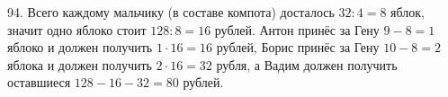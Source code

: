 94. Всего каждому мальчику (в составе компота) досталось $32:4=8$ яблок, значит одно яблоко стоит $128:8=16$ рублей. Антон принёс за Гену $9-8=1$ яблоко и должен получить $1\cdot16=16$ рублей, Борис принёс за Гену $10-8=2$ яблока и должен получить $2\cdot16=32$ рубля, а Вадим должен получить оставшиеся $128-16-32=80$ рублей.\\
